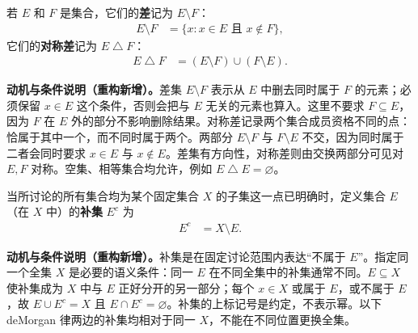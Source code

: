 \documentclass[../../main.tex]{subfiles}%
\begin{document}

\begin{definition}[差与对称差]\label{definition:ch00-set-differences}
若 $E$ 和 $F$ 是集合，它们的\textbf{差}记为 $E\setminus F$：
\begin{align*}
E\setminus F&=\{x:x\in E\text{ 且 }x\notin F\},
\end{align*}
它们的\textbf{对称差}记为 $E\mathbin{\triangle}F$：
\begin{align*}
E\mathbin{\triangle}F&=(E\setminus F)\cup(F\setminus E).
\end{align*}
\end{definition}
\begin{remark}
\textbf{动机与条件说明（重构新增）。}差集 $E\setminus F$ 表示从 $E$ 中删去同时属于 $F$ 的元素；必须保留 $x\in E$ 这个条件，否则会把与 $E$ 无关的元素也算入。这里不要求 $F\subseteq E$，因为 $F$ 在 $E$ 外的部分不影响删除结果。对称差记录两个集合成员资格不同的点：恰属于其中一个，而不同时属于两个。两部分 $E\setminus F$ 与 $F\setminus E$ 不交，因为同时属于二者会同时要求 $x\in E$ 与 $x\notin E$。差集有方向性，对称差则由交换两部分可见对 $E,F$ 对称。空集、相等集合均允许，例如 $E\mathbin{\triangle}E=\varnothing$。
\end{remark}



\begin{definition}[补集]\label{definition:ch00-complement-demorgan}
当所讨论的所有集合均为某个固定集合 $X$ 的子集这一点已明确时，定义集合 $E$（在 $X$ 中）的\textbf{补集} $E^c$ 为
\begin{align*}
E^c&=X\setminus E.
\end{align*}
\end{definition}
\begin{remark}
\textbf{动机与条件说明（重构新增）。}补集是在固定讨论范围内表达“不属于 $E$”。指定同一个全集 $X$ 是必要的语义条件：同一 $E$ 在不同全集中的补集通常不同。$E\subseteq X$ 使补集成为 $X$ 中与 $E$ 正好分开的另一部分；每个 $x\in X$ 或属于 $E$，或不属于 $E$，故 $E\cup E^c=X$ 且 $E\cap E^c=\varnothing$。补集的上标记号是约定，不表示幂。以下 deMorgan 律两边的补集均相对于同一 $X$，不能在不同位置更换全集。
\end{remark}
\end{document}
